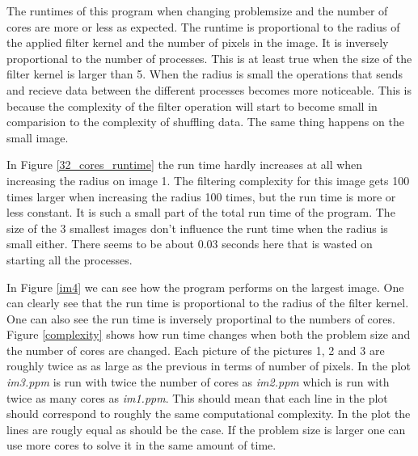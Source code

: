 \documentclass[a4paper,11pt]{article}
\begin{document}
The runtimes of this program when changing problemsize and the number of cores are more or less as expected.
The runtime is proportional to the radius of the applied filter kernel and the number of pixels in the image.
It is inversely proportional to the number of processes.
This is at least true when the size of the filter kernel is larger than 5.
When the radius is small the operations that sends and recieve data between the different processes becomes more noticeable.
This is because the complexity of the filter operation will start to become small in comparision to the complexity of shuffling data.
The same thing happens on the small image.

In Figure \ref{32_cores_runtime} the run time hardly increases at all when increasing the radius on image 1.
The filtering complexity for this image gets 100 times larger when increasing the radius 100 times, but the run time is more or less constant.
It is such a small part of the total run time of the program.
The size of the 3 smallest images don't influence the runt time when the radius is small either.
There seems to be about 0.03 seconds here that is wasted on starting all the processes.

In Figure \ref{im4} we can see how the program performs on the largest image.
One can clearly see that the run time is proportional to the radius of the filter kernel.
One can also see the run time is inversely proportinal to the numbers of cores.
Figure \ref{complexity} shows how run time changes when both the problem size and the number of cores are changed.
Each picture of the pictures 1, 2 and 3 are roughly twice as as large as the previous in terms of number of pixels.
In the plot \emph{im3.ppm} is run with twice the number of cores as \emph{im2.ppm} which is run with twice as many cores as \emph{im1.ppm}.
This should mean that each line in the plot should correspond to roughly the same computational complexity.
In the plot the lines are rougly equal as should be the case.
If the problem size is larger one can use more cores to solve it in the same amount of time.
\end{document}
